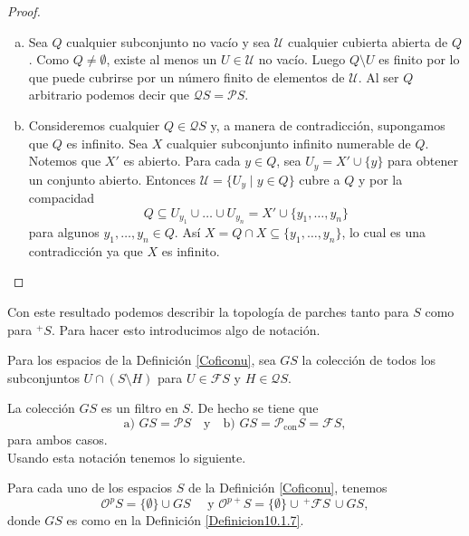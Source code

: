 \begin{proof}
    \begin{enumerate}[a)]
        \item Sea $Q$ cualquier subconjunto no vacío y sea $\mathcal{U}$ cualquier cubierta abierta de $Q$. Como $Q\neq \emptyset$, existe al menos un $U\in \mathcal{U}$ no vacío. Luego $Q\setminus U$ es finito por lo que puede cubrirse por un número finito de elementos de $\mathcal{U}$. Al ser $Q$ arbitrario podemos decir que $\mathcal{Q}S=\mathcal{P}S$.

        \item Consideremos cualquier $Q\in \mathcal{Q}S$ y, a manera de contradicción, supongamos que $Q$ es infinito. Sea $X$ cualquier subconjunto infinito numerable de $Q$. Notemos que $X'$ es abierto. Para cada $y\in Q$, sea $U_y=X'\cup \{y\}$ para obtener un conjunto abierto. Entonces $\mathcal{U}=\{U_y\mid y\in Q\}$ cubre a $Q$ y por la compacidad 
        \[
        Q\subseteq U_{y_1}\cup \ldots \cup U_{y_n}=X'\cup \{y_1,\ldots , y_n\}
        \]
        para algunos $y_1, \ldots , y_n\in Q$. Así $X=Q\cap X\subseteq \{y_1,\ldots , y_n\}$, lo cual es una contradicción ya que $X$ es infinito.
    \end{enumerate}
\end{proof}

Con este resultado podemos describir la topología de parches tanto para $S$ como para $^+S$. Para hacer esto introducimos algo de notación.

\begin{dfn}\label{Definicion10.1.7}
    Para los espacios de la Definición \ref{Coficonu}, sea $GS$ la colección de todos los subconjuntos $U\cap (S\setminus H)$ para $U\in \mathcal{F}S$ y $H\in \mathcal{Q}S$. 
\end{dfn}

La colección $GS$ es un filtro en $S$. De hecho se tiene que 
\[
\mbox{a) }GS=\mathcal{P}S\quad \mbox{y}\quad \mbox{b) }GS=\mathcal{P}_{\mbox{con}}S=\mathcal{F}S,
\]
para ambos casos.\\

Usando esta notación tenemos lo siguiente.

\begin{thm}\label{Teorema10.1.8}
    Para cada uno de los espacios $S$ de la Definición \ref{Coficonu}, tenemos
    \[
    \mathcal{O}^pS=\{\emptyset\}\cup GS\quad \mbox{ y }\mathcal{O}^{p+}S=\{\emptyset\}\cup \,^+\mathcal{F}S\,\cup GS,
    \]
    donde $GS$ es como en la Definición \ref{Definicion10.1.7}.
\end{thm}

